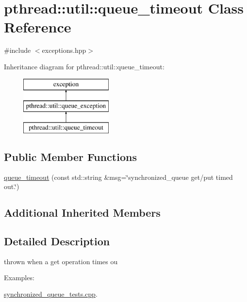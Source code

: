 \hypertarget{classpthread_1_1util_1_1queue__timeout}{\section{pthread\+:\+:util\+:\+:queue\+\_\+timeout Class Reference}
\label{classpthread_1_1util_1_1queue__timeout}
}


{\ttfamily \#include $<$exceptions.\+hpp$>$}

Inheritance diagram for pthread\+:\+:util\+:\+:queue\+\_\+timeout\+:\begin{figure}[H]
\begin{center}
\leavevmode
\includegraphics[height=3.000000cm]{classpthread_1_1util_1_1queue__timeout}
\end{center}
\end{figure}
\subsection*{Public Member Functions}
\begin{DoxyCompactItemize}
\item 
\hyperlink{classpthread_1_1util_1_1queue__timeout_a9bbc5bcc7fba68aceb1aec4d4b922b74}{queue\+\_\+timeout} (const std\+::string \&msg=\char`\"{}synchronized\+\_\+queue get/put timed out.\char`\"{})
\end{DoxyCompactItemize}
\subsection*{Additional Inherited Members}


\subsection{Detailed Description}
thrown when a get operation times ou \begin{Desc}
\item[Examples\+: ]\par
\hyperlink{synchronized_queue_tests_8cpp-example}{synchronized\+\_\+queue\+\_\+tests.\+cpp}.\end{Desc}


